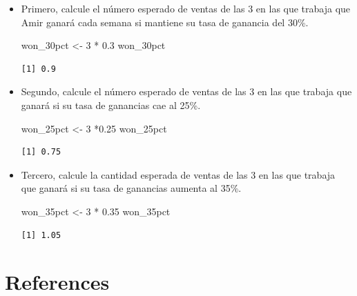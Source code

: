 \documentclass[
  letterpaper,
  DIV=11,
  numbers=noendperiod]{scrreprt}
\newenvironment{Shaded}{\begin{snugshade}}{\end{snugshade}}
\newcommand{\DecValTok}[1]{\textcolor[rgb]{0.68,0.00,0.00}{#1}}
\newcommand{\FloatTok}[1]{\textcolor[rgb]{0.68,0.00,0.00}{#1}}
\newcommand{\NormalTok}[1]{\textcolor[rgb]{0.00,0.23,0.31}{#1}}
\newcommand{\OtherTok}[1]{\textcolor[rgb]{0.00,0.23,0.31}{#1}}
\newcommand{\SpecialCharTok}[1]{\textcolor[rgb]{0.37,0.37,0.37}{#1}}
\newlength{\cslhangindent}
\newlength{\cslentryspacingunit} %
\newenvironment{CSLReferences}[2] %
 {%
  \setlength{\parindent}{0pt}
  \ifodd #1
  \let\oldpar\par
  \def\par{\hangindent=\cslhangindent\oldpar}
  \fi
  \setlength{\parskip}{#2\cslentryspacingunit}
 }%
 {}
\begin{document}
\begin{itemize}
\item
  Primero, calcule el número esperado de ventas de las 3 en las que
  trabaja que Amir ganará cada semana si mantiene su tasa de ganancia
  del 30\%.

\begin{Shaded}
\begin{Highlighting}[]
\NormalTok{won\_30pct }\OtherTok{\textless{}{-}} \DecValTok{3} \SpecialCharTok{*} \FloatTok{0.3}
\NormalTok{won\_30pct}
\end{Highlighting}
\end{Shaded}

\begin{verbatim}
[1] 0.9
\end{verbatim}
\item
  Segundo, calcule el número esperado de ventas de las 3 en las que
  trabaja que ganará si su tasa de ganancias cae al 25\%.

\begin{Shaded}
\begin{Highlighting}[]
\NormalTok{won\_25pct }\OtherTok{\textless{}{-}} \DecValTok{3} \SpecialCharTok{*}\FloatTok{0.25}
\NormalTok{won\_25pct}
\end{Highlighting}
\end{Shaded}

\begin{verbatim}
[1] 0.75
\end{verbatim}
\item
  Tercero, calcule la cantidad esperada de ventas de las 3 en las que
  trabaja que ganará si su tasa de ganancias aumenta al 35\%.

\begin{Shaded}
\begin{Highlighting}[]
\NormalTok{won\_35pct }\OtherTok{\textless{}{-}} \DecValTok{3} \SpecialCharTok{*} \FloatTok{0.35}
\NormalTok{won\_35pct}
\end{Highlighting}
\end{Shaded}

\begin{verbatim}
[1] 1.05
\end{verbatim}
\end{itemize}


\hypertarget{references}{%
\chapter*{References}\label{references}}


\hypertarget{refs}{}
\begin{CSLReferences}{0}{0}
\end{CSLReferences}
\end{document}
